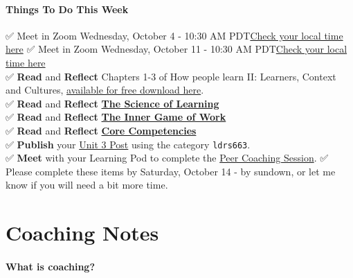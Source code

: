 \documentclass[
]{book}
\begin{document}
\begin{feedback}
\hypertarget{things-to-do-this-week}{%
\subsubsection*{Things To Do This Week}\label{things-to-do-this-week}}

✅ Meet in Zoom {Wednesday, October 4 - 10:30 AM PDT}\href{https://www.timeanddate.com/worldclock/fixedtime.html?msg=LDRS663+Meeting\&iso=20231004T1030\&p1=1109\&ah=1}{Check your local time here}
✅ Meet in Zoom {Wednesday, October 11 - 10:30 AM PDT}\href{https://www.timeanddate.com/worldclock/fixedtime.html?msg=LDRS663+Meeting\&iso=20231011T1030\&p1=1109\&ah=1}{Check your local time here}\\
✅ \textbf{Read} and \textbf{Reflect} Chapters 1-3 of How people learn II: Learners, Context and Cultures, \href{https://www.nap.edu/catalog/24783}{available for free download here}.\\
✅ \textbf{Read} and \textbf{Reflect} \href{https://deansforimpact.org/wp-content/uploads/2016/12/The_Science_of_Learning.pdf}{\textbf{The Science of Learning}}\\
✅ \textbf{Read} and \textbf{Reflect} \href{https://thesystemsthinker.com/the-inner-game-of-work-building-capability-in-the-workplace/}{\textbf{The Inner Game of Work}}\\
✅ \textbf{Read} and \textbf{Reflect} \href{https://coachfederation.org/core-competencies}{\textbf{Core Competencies}}\\
✅ \textbf{Publish} your \href{https://ma-lead.github.io/ldrs663/assessments.html\#post-3}{Unit 3 Post} using the category \texttt{ldrs663}.\\
✅ \textbf{Meet} with your Learning Pod to complete the \href{https://ma-lead.github.io/ldrs663/assessments.html\#peer-coaching-session}{Peer Coaching Session}.
✅ Please complete these items by {Saturday, October 14 - by sundown}, or let me know if you will need a bit more time.
\end{feedback}

\hypertarget{coaching-notes}{%
\chapter*{Coaching Notes}\label{coaching-notes}}

\hypertarget{what-is-coaching}{%
\subsubsection*{\texorpdfstring{What is \textbf{coaching}?}{What is coaching?}}\label{what-is-coaching}}
\end{document}
